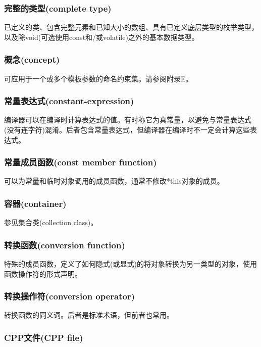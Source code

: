 \subsubsection{完整的类型(complete type)}

已定义的类、包含完整元素和已知大小的数组、具有已定义底层类型的枚举类型，以及除void(可选使用const和/或volatile)之外的基本数据类型。

\subsubsection{概念(concept)}

可应用于一个或多个模板参数的命名约束集。请参阅附录E。

\subsubsection{常量表达式(constant-expression)}

编译器可以在编译时计算表达式的值。有时称它为真常量，以避免与常量表达式(没有连字符)混淆。后者包含常量表达式，但编译器在编译时不一定会计算这些表达式。

\subsubsection{常量成员函数(const member function)}

可以为常量和临时对象调用的成员函数，通常不修改*this对象的成员。

\subsubsection{容器(container)}

参见集合类(collection class)。

\subsubsection{转换函数(conversion function)}

特殊的成员函数，定义了如何隐式(或显式)的将对象转换为另一类型的对象，使用函数操作符的形式声明。

\subsubsection{转换操作符(conversion operator)}

转换函数的同义词。后者是标准术语，但前者也常用。

\subsubsection{CPP文件(CPP file)}


